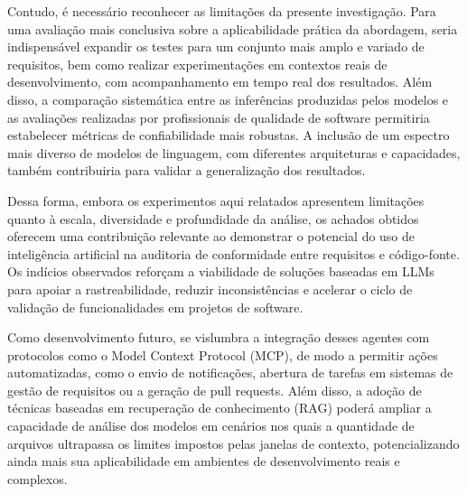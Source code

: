 Contudo, é necessário reconhecer as limitações da presente investigação. Para uma avaliação mais conclusiva sobre a aplicabilidade prática da abordagem, seria indispensável expandir os testes para um conjunto mais amplo e variado de requisitos, bem como realizar experimentações em contextos reais de desenvolvimento, com acompanhamento em tempo real dos resultados. Além disso, a comparação sistemática entre as inferências produzidas pelos modelos e as avaliações realizadas por profissionais de qualidade de software permitiria estabelecer métricas de confiabilidade mais robustas. A inclusão de um espectro mais diverso de modelos de linguagem, com diferentes arquiteturas e capacidades, também contribuiria para validar a generalização dos resultados.

Dessa forma, embora os experimentos aqui relatados apresentem limitações quanto à escala, diversidade e profundidade da análise, os achados obtidos oferecem uma contribuição relevante ao demonstrar o potencial do uso de inteligência artificial na auditoria de conformidade entre requisitos e código-fonte. Os indícios observados reforçam a viabilidade de soluções baseadas em LLMs para apoiar a rastreabilidade, reduzir inconsistências e acelerar o ciclo de validação de funcionalidades em projetos de software.

Como desenvolvimento futuro, se vislumbra a integração desses agentes com protocolos como o Model Context Protocol (MCP), de modo a permitir ações automatizadas, como o envio de notificações, abertura de tarefas em sistemas de gestão de requisitos ou a geração de pull requests. Além disso, a adoção de técnicas baseadas em recuperação de conhecimento (RAG) poderá ampliar a capacidade de análise dos modelos em cenários nos quais a quantidade de arquivos ultrapassa os limites impostos pelas janelas de contexto, potencializando ainda mais sua aplicabilidade em ambientes de desenvolvimento reais e complexos.